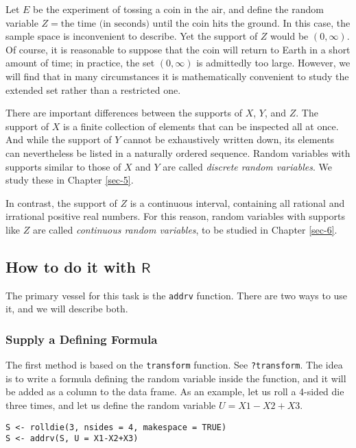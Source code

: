 Let \(E\) be the experiment of tossing a coin in the air, and define
the random variable \( Z = \mbox{the time (in seconds) until the coin
hits the ground} \). In this case, the sample space is inconvenient to
describe. Yet the support of \(Z\) would be \((0,\infty)\). Of course,
it is reasonable to suppose that the coin will return to Earth in a
short amount of time; in practice, the set \((0,\infty)\) is
admittedly too large. However, we will find that in many circumstances
it is mathematically convenient to study the extended set rather than
a restricted one.


There are important differences between the supports of \(X\), \(Y\),
and \(Z\). The support of \(X\) is a finite collection of elements
that can be inspected all at once. And while the support of \(Y\)
cannot be exhaustively written down, its elements can nevertheless be
listed in a naturally ordered sequence. Random variables with supports
similar to those of \(X\) and \(Y\) are called \emph{discrete random
variables}. We study these in Chapter \ref{sec-5}.

In contrast, the support of \(Z\) is a continuous interval, containing
all rational and irrational positive real numbers. For this
reason, random variables with supports like \(Z\) are
called \emph{continuous random variables}, to be studied in Chapter
\ref{sec-6}.

\subsection{How to do it with \(\mathsf{R}\)}
\label{sec-4-9-1}

The primary vessel for this task is the \texttt{addrv} function. There are
two ways to use it, and we will describe both.

\subsubsection{Supply a Defining Formula}
\label{sec-4-9-1-1}

The first method is based on the \texttt{transform} function. See
\texttt{?transform}. The idea is to write a formula defining the random
variable inside the function, and it will be added as a column to the
data frame. As an example, let us roll a 4-sided die three times, and
let us define the random variable \(U=X1-X2+X3\).

\begin{verbatim}
S <- rolldie(3, nsides = 4, makespace = TRUE) 
S <- addrv(S, U = X1-X2+X3) 
\end{verbatim}

